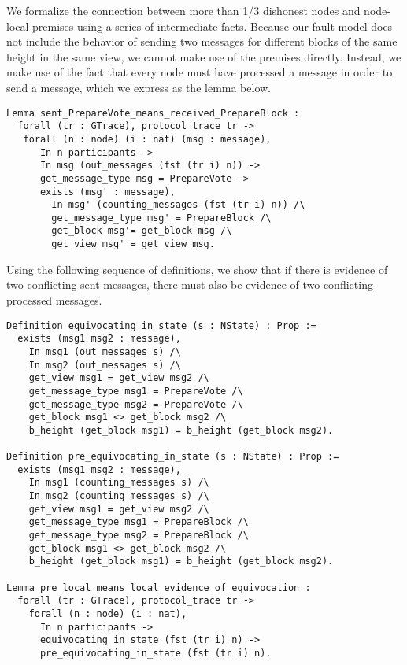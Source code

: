 \documentclass{easychair}
\begin{document}
We formalize the connection between more than 1/3 dishonest nodes and node-local premises using a series of intermediate facts. Because our fault model does not include the behavior of sending two  messages for different blocks of the same height in the same view, we cannot make use of the premises directly. Instead, we make use of the fact that every node must have processed a  message in order to send a  message, which we express as the lemma below.
\begin{lstlisting}[language=Coq]
Lemma sent_PrepareVote_means_received_PrepareBlock :
  forall (tr : GTrace), protocol_trace tr ->
   forall (n : node) (i : nat) (msg : message),
      In n participants ->
      In msg (out_messages (fst (tr i) n)) ->
      get_message_type msg = PrepareVote ->
      exists (msg' : message),
        In msg' (counting_messages (fst (tr i) n)) /\
        get_message_type msg' = PrepareBlock /\
        get_block msg'= get_block msg /\
        get_view msg' = get_view msg.
\end{lstlisting}
Using the following sequence of definitions, we show that if there is evidence of two conflicting sent  messages, there must also be evidence of two conflicting processed  messages.

\begin{lstlisting}[language=Coq]
Definition equivocating_in_state (s : NState) : Prop :=
  exists (msg1 msg2 : message),
    In msg1 (out_messages s) /\
    In msg2 (out_messages s) /\
    get_view msg1 = get_view msg2 /\
    get_message_type msg1 = PrepareVote /\
    get_message_type msg2 = PrepareVote /\
    get_block msg1 <> get_block msg2 /\
    b_height (get_block msg1) = b_height (get_block msg2).
    
Definition pre_equivocating_in_state (s : NState) : Prop :=
  exists (msg1 msg2 : message),
    In msg1 (counting_messages s) /\
    In msg2 (counting_messages s) /\
    get_view msg1 = get_view msg2 /\
    get_message_type msg1 = PrepareBlock /\
    get_message_type msg2 = PrepareBlock /\
    get_block msg1 <> get_block msg2 /\
    b_height (get_block msg1) = b_height (get_block msg2).
    
Lemma pre_local_means_local_evidence_of_equivocation :
  forall (tr : GTrace), protocol_trace tr ->
    forall (n : node) (i : nat),
      In n participants ->
      equivocating_in_state (fst (tr i) n) ->
      pre_equivocating_in_state (fst (tr i) n).
\end{lstlisting}
\end{document}
